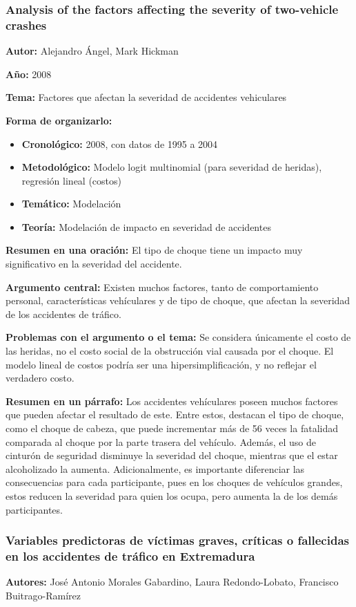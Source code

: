 \documentclass{book}
\begin{document}
\subsubsection{Analysis of the factors affecting the severity of two-vehicle crashes}
\textbf{Autor:} Alejandro Ángel, Mark Hickman

\textbf{Año:} 2008

\textbf{Tema:} Factores que afectan la severidad de accidentes vehiculares

\textbf{Forma de organizarlo:}

\begin{itemize}
\setlength{\itemindent}{0.5in}
    \item \textbf{Cronológico:} 2008, con datos de 1995 a 2004
    \item \textbf{Metodológico:} Modelo logit multinomial (para severidad de heridas), regresión lineal (costos)
    \item \textbf{Temático:} Modelación
    \item \textbf{Teoría:} Modelación de impacto en severidad de accidentes
\end{itemize}

\textbf{Resumen en una oración:} El tipo de choque tiene un impacto muy significativo en la severidad del accidente.

\textbf{Argumento central:} Existen muchos factores, tanto de comportamiento personal, características vehículares y de tipo de choque, que afectan la severidad de los accidentes de tráfico.

\textbf{Problemas con el argumento o el tema:} Se considera únicamente el costo de las heridas, no el costo social de la obstrucción vial causada por el choque. El modelo lineal de costos podría ser una hipersimplificación, y no reflejar el verdadero costo.

\textbf{Resumen en un párrafo:} Los accidentes vehículares poseen muchos factores que pueden afectar el resultado de este. Entre estos, destacan el tipo de choque, como el choque de cabeza, que puede incrementar más de 56 veces la fatalidad comparada al choque por la parte trasera del vehículo. Además, el uso de cinturón de seguridad disminuye la severidad del choque, mientras que el estar alcoholizado la aumenta. Adicionalmente, es importante diferenciar las consecuencias para cada participante, pues en los choques de vehículos grandes, estos reducen la severidad para quien los ocupa, pero aumenta la de los demás participantes. 

\subsubsection{Variables predictoras de víctimas graves, críticas o fallecidas en los accidentes de tráfico en Extremadura}
\textbf{Autores:} José Antonio Morales Gabardino, Laura Redondo-Lobato, Francisco Buitrago-Ramírez
\end{document}
